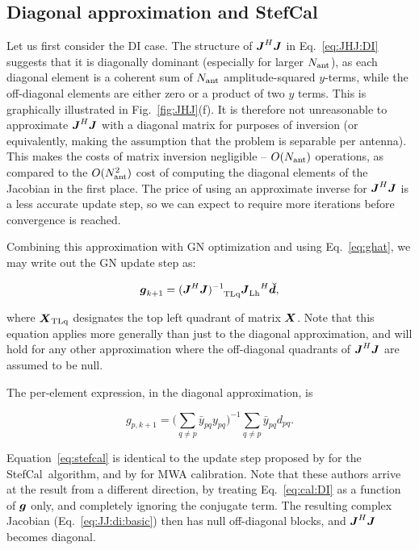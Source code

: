 \documentclass[useAMS,usenatbib]{mn2e}
\newcommand{\vecg}{\bmath{g}}
\newcommand{\mat}[1]{{\bmath{#1}}}
\newcommand{\JJ}{\mat{J}} %
\newcommand{\JHJ}{\JJ^H\JJ} %
\newcommand{\StefCal}{{\sc StefCal}}
\begin{document}
\subsection{Diagonal approximation and \StefCal}
\label{sec:DI:stefcal}

Let us first consider the DI case. The structure of $\JJ^H\JJ$ in Eq.~\ref{eq:JHJ:DI} suggests that it is diagonally 
dominant (especially for larger $N_\mathrm{ant}$), as each diagonal element is a coherent sum of $N_\mathrm{ant}$ amplitude-squared $y$-terms, 
while the off-diagonal elements are either zero or a product of two $y$ terms. This is graphically illustrated in 
Fig.~\ref{fig:JHJ}(f). It is therefore not unreasonable 
to approximate $\JHJ$ with a diagonal matrix for purposes of inversion (or equivalently, making the assumption that 
the problem is separable per antenna). This makes the costs of matrix inversion negligible -- $O(N_\mathrm{ant})$ operations, as 
compared to the $O(N_\mathrm{ant}^2)$ cost 
of computing the diagonal elements of the Jacobian in the first place. The price of using an approximate inverse for 
$\JHJ$ is a less accurate update step, so we can expect to require more iterations before convergence is reached.

Combining this approximation with GN optimization and using Eq.~\ref{eq:ghat}, we may write out the GN update step as:

\begin{equation}
\label{eq:stefcal-matrix}
\vecg_{k+1} = (\JHJ)^{-1}_{~~~\UL} \JJ_\LEFT^{~~~H} \Dd,
\end{equation}

where $\bmath{X}_\UL$ designates the top left quadrant of matrix $\bmath{X}$. Note that this equation applies more
generally than just to the diagonal approximation, and will hold for any other approximation where the off-diagonal 
quadrants of $\JHJ$ are assumed to be null.

The per-element expression, in the diagonal approximation, is

\begin{equation}
\label{eq:stefcal}
g_{p,k+1} = \big( \sum\limits_{q\ne p} \bar{y}_{pq} y_{pq} \big)^{-1} \sum\limits_{q\ne p} \bar{y}_{pq} d_{pq}.
\end{equation}

Equation~\ref{eq:stefcal} 
is identical to the update step proposed by \citet{Stefcal} for the \StefCal\ algorithm, and by \citet{Mitchell-RTS} for MWA calibration. Note that these authors arrive at the result from a different 
direction, by treating Eq.~\ref{eq:cal:DI} as a function of $\bmath{g}$ only, and completely ignoring the conjugate term. 
The resulting complex Jacobian (Eq.~\ref{eq:JJ:di:basic}) then has null off-diagonal blocks, and $\JJ^H\JJ$ becomes 
diagonal.
\end{document}
